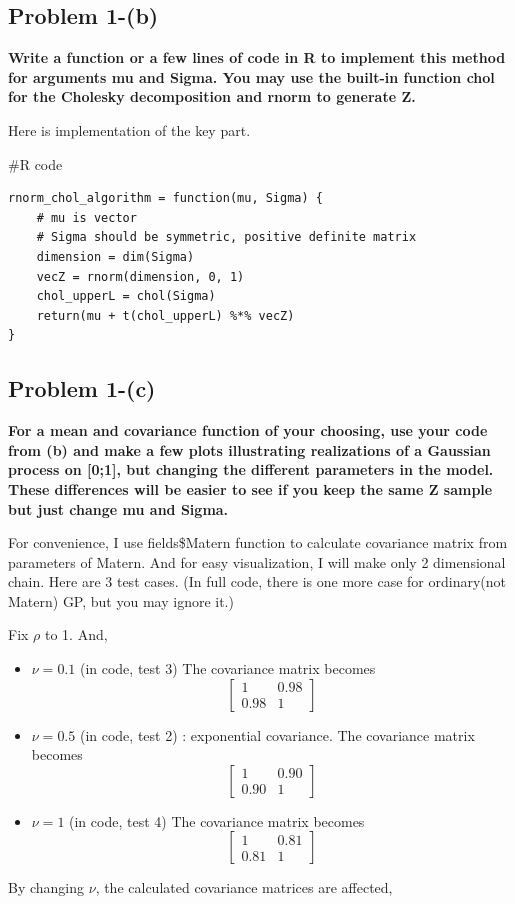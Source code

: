 \documentclass{article}
\newenvironment{Rcode}%
{%
    \begin{mdframed}
    \#R code
    \begin{small}
}
{%
    \end{small}
    \end{mdframed}
}
\begin{document}
\subsection{Problem 1-(b)}
\textbf{
Write a function or a few lines of code in R to implement this method
for arguments mu and Sigma. You may use the built-in function chol for the Cholesky decomposition and rnorm to generate Z.
}

Here is implementation of the key part.

\begin{Rcode}
    \begin{verbatim}
rnorm_chol_algorithm = function(mu, Sigma) {
    # mu is vector
    # Sigma should be symmetric, positive definite matrix
    dimension = dim(Sigma)
    vecZ = rnorm(dimension, 0, 1)
    chol_upperL = chol(Sigma)
    return(mu + t(chol_upperL) %*% vecZ)    
}
    \end{verbatim}
\end{Rcode}



\subsection{Problem 1-(c)}
\textbf{
For a mean and covariance function of your choosing, use your code from (b) and
make a few plots illustrating realizations of a Gaussian process on [0;1], but changing the different parameters in the model.
These differences will be easier to see if you keep the same Z sample but just change mu and Sigma.
}

For convenience, I use fields\$Matern function to calculate covariance matrix from parameters of Matern.
And for easy visualization, I will make only 2 dimensional chain.
Here are 3 test cases. (In full code, there is one more case for ordinary(not Matern) GP, but you may ignore it.)

Fix $\rho$ to 1. And,
\begin{itemize}
    \item $\nu = 0.1$ (in code, test 3)
    The covariance matrix becomes
    \[\begin{bmatrix}
        1 & 0.98 \\ 0.98 & 1
    \end{bmatrix}
    \]
    \item $\nu = 0.5$ (in code, test 2) : exponential covariance. 
    The covariance matrix becomes
    \[\begin{bmatrix}
        1 & 0.90 \\ 0.90 & 1
    \end{bmatrix}
    \]
    \item $\nu = 1$ (in code, test 4)
    The covariance matrix becomes
    \[\begin{bmatrix}
        1 & 0.81 \\ 0.81 & 1
    \end{bmatrix}
    \]
\end{itemize}
By changing $\nu$, the calculated covariance matrices are affected,
\end{document}

